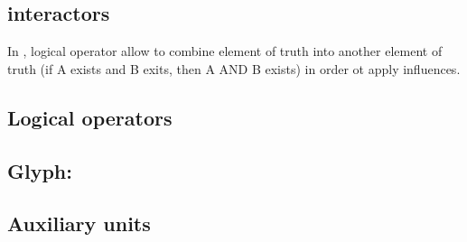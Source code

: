 \subsection{interactors}\label{sec:interactors}





In \SBGNERLone{}, logical operator allow to combine element of truth into another element of truth (if A exists and B exits, then A AND B exists) in order ot apply influences.

\subsection{Logical operators}\label{sec:logic}
 






\subsection{Glyph: }\label{sec:perturbation}



\subsection{Auxiliary units}\label{sec:aux}

